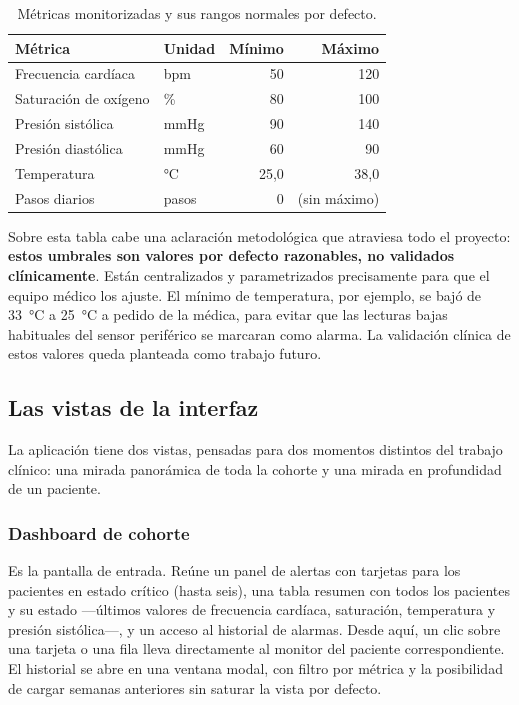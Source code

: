 \documentclass[12pt,a4paper]{article}
\begin{document}
    \begin{table}[h]
        \centering
        \begin{tabular}{l l r r}
            \hline
            \textbf{Métrica} & \textbf{Unidad} & \textbf{Mínimo} & \textbf{Máximo} \\
            \hline
            Frecuencia cardíaca & bpm & 50 & 120 \\
            Saturación de oxígeno & \% & 80 & 100 \\
            Presión sistólica & mmHg & 90 & 140 \\
            Presión diastólica & mmHg & 60 & 90 \\
            Temperatura & °C & 25,0 & 38,0 \\
            Pasos diarios & pasos & 0 & (sin máximo) \\
            \hline
        \end{tabular}
        \caption{Métricas monitorizadas y sus rangos normales por defecto.}
        \label{tab:umbrales}
    \end{table}

    Sobre esta tabla cabe una aclaración metodológica que atraviesa todo el proyecto: \textbf{estos umbrales son valores por defecto razonables, no validados clínicamente}. Están centralizados y parametrizados precisamente para que el equipo médico los ajuste. El mínimo de temperatura, por ejemplo, se bajó de 33~°C a 25~°C a pedido de la médica, para evitar que las lecturas bajas habituales del sensor periférico se marcaran como alarma. La validación clínica de estos valores queda planteada como trabajo futuro.

    \subsection{Las vistas de la interfaz}
    La aplicación tiene dos vistas, pensadas para dos momentos distintos del trabajo clínico: una mirada panorámica de toda la cohorte y una mirada en profundidad de un paciente.

    \subsubsection{Dashboard de cohorte}
    Es la pantalla de entrada. Reúne un panel de alertas con tarjetas para los pacientes en estado crítico (hasta seis), una tabla resumen con todos los pacientes y su estado —últimos valores de frecuencia cardíaca, saturación, temperatura y presión sistólica—, y un acceso al historial de alarmas. Desde aquí, un clic sobre una tarjeta o una fila lleva directamente al monitor del paciente correspondiente. El historial se abre en una ventana modal, con filtro por métrica y la posibilidad de cargar semanas anteriores sin saturar la vista por defecto.
\end{document}
